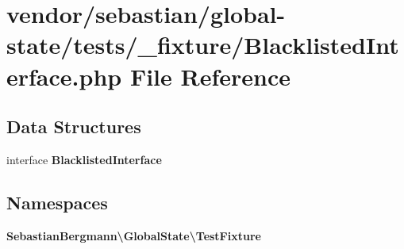 \section{vendor/sebastian/global-\/state/tests/\+\_\+fixture/\+Blacklisted\+Interface.php File Reference}
\label{_blacklisted_interface_8php}
\subsection*{Data Structures}
\begin{DoxyCompactItemize}
\item 
interface {\bf Blacklisted\+Interface}
\end{DoxyCompactItemize}
\subsection*{Namespaces}
\begin{DoxyCompactItemize}
\item 
 {\bf Sebastian\+Bergmann\textbackslash{}\+Global\+State\textbackslash{}\+Test\+Fixture}
\end{DoxyCompactItemize}
